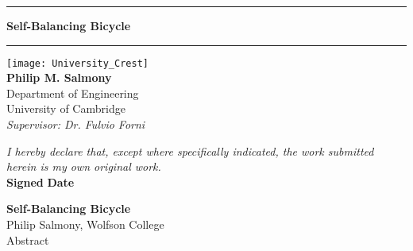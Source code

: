 \begin{titlepage}
	\begin{center}
		\hrule
		\vspace{0.5cm}
		\Huge{\textbf{Self-Balancing Bicycle}} \\
		\vspace{0.5cm}
		\hrule
		\vspace{4cm}
		\texttt{[image: University\_Crest]} \\
		\vspace{3cm}
		\large{\textbf{Philip M. Salmony} \\
		Department of Engineering \\
		University of Cambridge} \\
		\vspace{1.5cm}
		\textit{Supervisor: Dr. Fulvio Forni}
	\end{center}

\vfill

\textit{I hereby declare that, except where specifically indicated, the work submitted herein is my own original work.} \\

\textbf{Signed} \hspace{0.5\textwidth} \textbf{Date}


\end{titlepage}

\newpage
{}

\begin{center}
	\Large{\textbf{Self-Balancing Bicycle}} \\
	\large{Philip Salmony, Wolfson College} \\
	\large{Abstract}
\end{center}

\newpage
{}

\tableofcontents

\newpage
\pagestyle{headings}
\setcounter{page}{1}